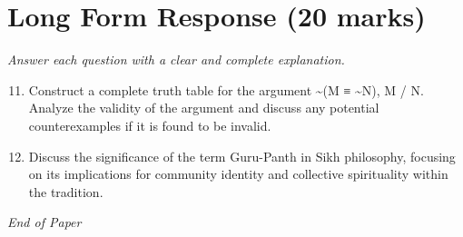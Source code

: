 \documentclass[12pt]{article}
\begin{document}
\section*{Long Form Response (20 marks)}
\textit{Answer each question with a clear and complete explanation.}
\begin{enumerate}[label=\arabic*.]
\setcounter{enumi}{10}
\item Construct a complete truth table for the argument \textasciitilde{}(M ≡ \textasciitilde{}N), M / N. Analyze the validity
of the argument and discuss any potential counterexamples if it is found to be invalid.
\item Discuss the significance of the term Guru-Panth in Sikh philosophy, focusing on its
implications for community identity and collective spirituality within the tradition.
\end{enumerate}

\vfill
\noindent\textit{End of Paper}
\end{document}
